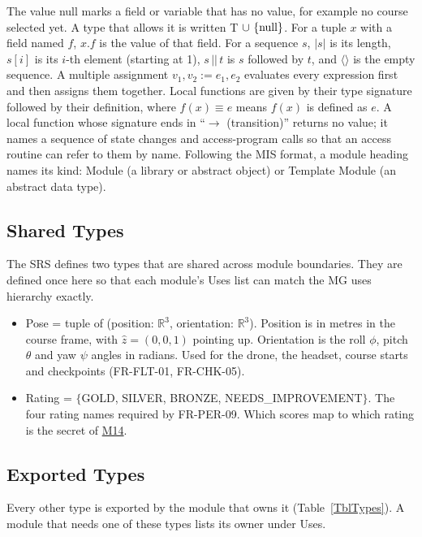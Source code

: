 \documentclass[12pt, titlepage]{article}
\newcommand{\nul}{\textnormal{null}}
\newcommand{\Mref}[1]{\hyperref[sec:M#1]{M#1}}
\begin{document}
\noindent
The value \nul{} marks a field or variable that has no value, for example no
course selected yet. A type that allows it is written T $\cup \ \{\nul\}$. For a
tuple $x$ with a field named $f$, $x.f$ is the value of that field. For a
sequence $s$, $|s|$ is its length, $s[i]$ is its $i$-th element (starting at
1), $s \,||\, t$ is $s$ followed by $t$, and $\langle\rangle$ is the empty
sequence. A multiple assignment $v_1, v_2 := e_1, e_2$ evaluates every
expression first and then assigns them together. Local functions are given by
their type signature followed by their definition, where $f(x) \equiv e$ means
$f(x)$ is defined as $e$. A local function whose signature ends in
``$\rightarrow$ (transition)'' returns no value; it names a sequence of state
changes and access-program calls so that an access routine can refer to them
by name. Following the MIS format, a
module heading names its kind: Module (a library or abstract object) or
Template Module (an abstract data type).

\subsection*{Shared Types}

The SRS defines two types that are shared across module boundaries. They are
defined once here so that
each module's Uses list can match the MG uses hierarchy exactly.

\begin{itemize}
\item Pose = tuple of (position: $\mathbb{R}^3$, orientation: $\mathbb{R}^3$).
  Position is in metres in the course frame, with $\hat{z} = (0, 0, 1)$
  pointing up. Orientation is the roll $\phi$, pitch $\theta$ and yaw $\psi$
  angles in radians. Used for the drone, the headset, course starts and
  checkpoints (FR-FLT-01, FR-CHK-05).
\item Rating = $\{$GOLD, SILVER, BRONZE, NEEDS\_IMPROVEMENT$\}$. The four
  rating names required by FR-PER-09. Which scores map to which rating is the
  secret of \Mref{14}.
\end{itemize}

\subsection*{Exported Types}

Every other type is exported by the module that owns it (Table~\ref{TblTypes}).
A module that needs one of these types lists its owner under Uses.
\end{document}
